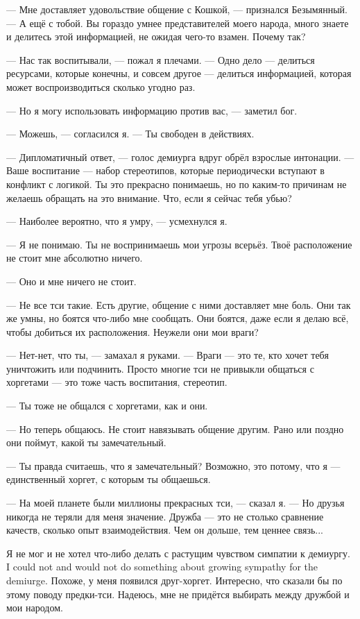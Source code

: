 --- Мне доставляет удовольствие общение с Кошкой, --- признался Безымянный.
--- А ещё с тобой.
Вы гораздо умнее представителей моего народа, много знаете и делитесь этой информацией, не ожидая чего-то взамен.
Почему так?

--- Нас так воспитывали, --- пожал я плечами.
--- Одно дело --- делиться ресурсами, которые конечны, и совсем другое --- делиться информацией, которая может воспроизводиться сколько угодно раз.

--- Но я могу использовать информацию против вас, --- заметил бог.

--- Можешь, --- согласился я.
--- Ты свободен в действиях.

--- Дипломатичный ответ, --- голос демиурга вдруг обрёл взрослые интонации.
--- Ваше воспитание --- набор стереотипов, которые периодически вступают в конфликт с логикой.
Ты это прекрасно понимаешь, но по каким-то причинам не желаешь обращать на это внимание.
Что, если я сейчас тебя убью?

--- Наиболее вероятно, что я умру, --- усмехнулся я.

--- Я не понимаю.
Ты не воспринимаешь мои угрозы всерьёз.
Твоё расположение не стоит мне абсолютно ничего.

--- Оно и мне ничего не стоит.

--- Не все тси такие.
Есть другие, общение с ними доставляет мне боль.
Они так же умны, но боятся что-либо мне сообщать.
Они боятся, даже если я делаю всё, чтобы добиться их расположения.
Неужели они мои враги?

--- Нет-нет, что ты, --- замахал я руками.
--- Враги --- это те, кто хочет тебя уничтожить или подчинить.
Просто многие тси не привыкли общаться с хоргетами --- это тоже часть воспитания, стереотип.

--- Ты тоже не общался с хоргетами, как и они.

--- Но теперь общаюсь.
Не стоит навязывать общение другим.
Рано или поздно они поймут, какой ты замечательный.

--- Ты правда считаешь, что я замечательный?
Возможно, это потому, что я --- единственный хоргет, с которым ты общаешься.

--- На моей планете были миллионы прекрасных тси, --- сказал я.
--- Но друзья никогда не теряли для меня значение.
Дружба --- это не столько сравнение качеств, сколько опыт взаимодействия.
Чем он дольше, тем ценнее связь...

{Я не мог и не хотел что-либо делать с растущим чувством симпатии к демиургу.}
{I could not and would not do something about growing sympathy for the demiurge.}
Похоже, у меня появился друг-хоргет.
Интересно, что сказали бы по этому поводу предки-тси.
Надеюсь, мне не придётся выбирать между дружбой и мои народом.

